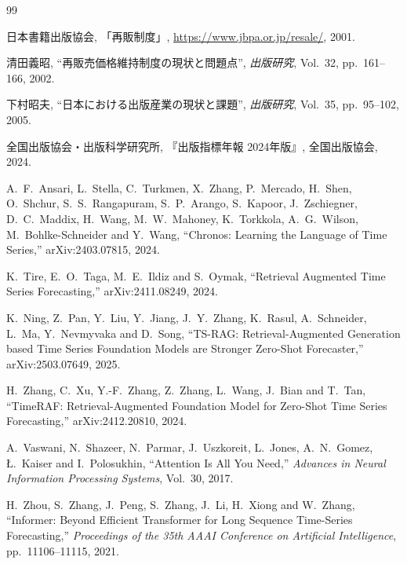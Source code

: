 \documentclass[twocolumn, lastpage]{jarticle}
\begin{document}
\begin{thebibliography}{99}

日本書籍出版協会,
「再販制度」,
\url{https://www.jbpa.or.jp/resale/}, 2001.

清田義昭,
``再販売価格維持制度の現状と問題点'',
\textit{出版研究}, Vol.~32, pp.~161--166, 2002.

下村昭夫,
``日本における出版産業の現状と課題'',
\textit{出版研究}, Vol.~35, pp.~95--102, 2005.

全国出版協会・出版科学研究所,
『出版指標年報 2024年版』,
全国出版協会, 2024.

A.~F.~Ansari, L.~Stella, C.~Turkmen, X.~Zhang, P.~Mercado, H.~Shen, O.~Shchur,
S.~S.~Rangapuram, S.~P.~Arango, S.~Kapoor, J.~Zschiegner, D.~C.~Maddix,
H.~Wang, M.~W.~Mahoney, K.~Torkkola, A.~G.~Wilson, M.~Bohlke-Schneider and Y.~Wang,
``Chronos: Learning the Language of Time Series,''
arXiv:2403.07815, 2024.

K.~Tire, E.~O.~Taga, M.~E.~Ildiz and S.~Oymak,
``Retrieval Augmented Time Series Forecasting,''
arXiv:2411.08249, 2024.

K.~Ning, Z.~Pan, Y.~Liu, Y.~Jiang, J.~Y.~Zhang, K.~Rasul, A.~Schneider, L.~Ma, Y.~Nevmyvaka and D.~Song,
``TS-RAG: Retrieval-Augmented Generation based Time Series Foundation Models are Stronger Zero-Shot Forecaster,''
arXiv:2503.07649, 2025.

H.~Zhang, C.~Xu, Y.-F.~Zhang, Z.~Zhang, L.~Wang, J.~Bian and T.~Tan,
``{TimeRAF}: Retrieval-Augmented Foundation Model for Zero-Shot Time Series Forecasting,''
arXiv:2412.20810, 2024.

A.~Vaswani, N.~Shazeer, N.~Parmar, J.~Uszkoreit, L.~Jones, A.~N.~Gomez, {\L}.~Kaiser and I.~Polosukhin,
``Attention Is All You Need,''
\textit{Advances in Neural Information Processing Systems}, Vol.~30, 2017.

H.~Zhou, S.~Zhang, J.~Peng, S.~Zhang, J.~Li, H.~Xiong and W.~Zhang,
``Informer: Beyond Efficient Transformer for Long Sequence Time-Series Forecasting,''
\textit{Proceedings of the 35th AAAI Conference on Artificial Intelligence}, pp.~11106--11115, 2021.


\end{thebibliography}
\end{document}
